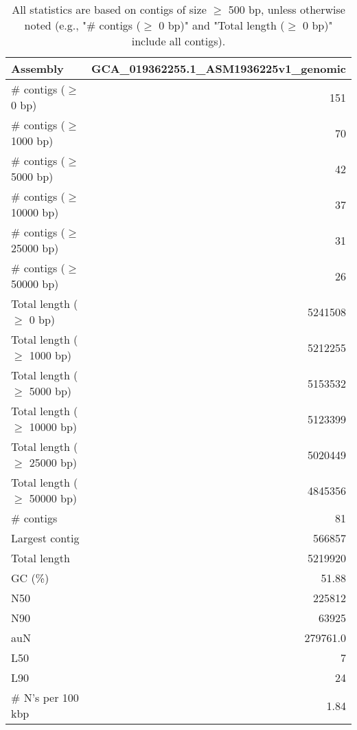 \documentclass[12pt,a4paper]{article}
\begin{document}
\begin{table}[ht]
\begin{center}
\caption{All statistics are based on contigs of size $\geq$ 500 bp, unless otherwise noted (e.g., "\# contigs ($\geq$ 0 bp)" and "Total length ($\geq$ 0 bp)" include all contigs).}
\begin{tabular}{|l*{1}{|r}|}
\hline
Assembly & GCA\_019362255.1\_ASM1936225v1\_genomic \\ \hline
\# contigs ($\geq$ 0 bp) & 151 \\ \hline
\# contigs ($\geq$ 1000 bp) & 70 \\ \hline
\# contigs ($\geq$ 5000 bp) & 42 \\ \hline
\# contigs ($\geq$ 10000 bp) & 37 \\ \hline
\# contigs ($\geq$ 25000 bp) & 31 \\ \hline
\# contigs ($\geq$ 50000 bp) & 26 \\ \hline
Total length ($\geq$ 0 bp) & 5241508 \\ \hline
Total length ($\geq$ 1000 bp) & 5212255 \\ \hline
Total length ($\geq$ 5000 bp) & 5153532 \\ \hline
Total length ($\geq$ 10000 bp) & 5123399 \\ \hline
Total length ($\geq$ 25000 bp) & 5020449 \\ \hline
Total length ($\geq$ 50000 bp) & 4845356 \\ \hline
\# contigs & 81 \\ \hline
Largest contig & 566857 \\ \hline
Total length & 5219920 \\ \hline
GC (\%) & 51.88 \\ \hline
N50 & 225812 \\ \hline
N90 & 63925 \\ \hline
auN & 279761.0 \\ \hline
L50 & 7 \\ \hline
L90 & 24 \\ \hline
\# N's per 100 kbp & 1.84 \\ \hline
\end{tabular}
\end{center}
\end{table}
\end{document}
